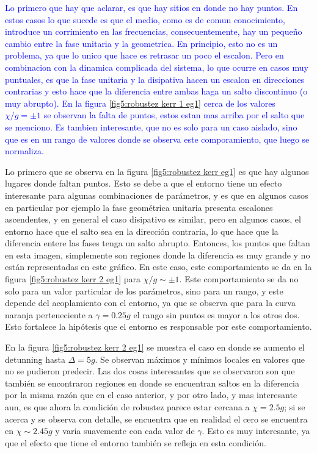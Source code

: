 \textcolor{blue}{Lo primero que hay que aclarar, es que hay sitios en donde no hay puntos. En estos casos lo que sucede es que el medio, como es de comun conocimiento, introduce un corrimiento en las frecuencias, consecuentemente, hay un pequeño cambio entre la fase unitaria y la geometrica. En principio, esto no es un problema, ya que lo unico que hace es retrasar un poco el escalon. Pero en combinacion con la dinamica complicada del sistema, lo que ocurre en casos muy puntuales, es que la fase unitaria y la disipativa hacen un escalon en direcciones contrarias y esto hace que la diferencia entre ambas haga un salto discontinuo (o muy abrupto). En la figura \ref{fig5:robustez kerr 1 eg1} cerca de los valores $\chi/g=\pm 1$ se observan la falta de puntos, estos estan mas arriba por el salto que se menciono. Es tambien interesante, que no es solo para un caso aislado, sino que es en un rango de valores donde se observa este comporamiento, que luego se normaliza. }

Lo primero que se observa en la figura \ref{fig5:robustez kerr eg1} es que hay algunos lugares donde faltan puntos. Esto se debe a que el entorno tiene un efecto interesante para algunas combinaciones de parámetros, y es que en algunos casos en particular por ejemplo la fase geométrica unitaria presenta escalones ascendentes, y en general el caso disipativo es similar, pero en algunos casos, el entorno hace que el salto sea en la dirección contraria, lo que hace que la diferencia entere las fases tenga un salto abrupto. Entonces, los puntos que faltan en esta imagen, simplemente son regiones donde la diferencia es muy grande y no están representadas en este gráfico. En este caso, este comportamiento se da en la figura \ref{fig5:robustez kerr 2 eg1} para $\chi / g \sim \pm 1$. Este comportamiento se da no solo para un valor particular de los parámetros, sino para un rango, y este depende del acoplamiento con el entorno, ya que se observa que para la curva naranja perteneciente a $\gamma=0.25g$ el rango sin puntos es mayor a los otros dos. Esto fortalece la hipótesis que el entorno es responsable por este comportamiento.

En la figura \ref{fig5:robustez kerr 2 eg1} se muestra el caso en donde se aumento el detunning hasta $\Delta=5g$. Se observan máximos y mínimos locales en valores que no se pudieron predecir. Las dos cosas interesantes que se observaron son que también se encontraron regiones en donde se encuentran saltos en la diferencia por la misma razón que en el caso anterior, y por otro lado, y mas interesante aun, es que ahora la condición de robustez parece estar cercana a $\chi=2.5g$; si se acerca y se observa con detalle, se encuentra que en realidad el cero se encuentra en $\chi\sim 2.45g$ y varia suavemente con cada valor de $\gamma$. Esto es muy interesante, ya que el efecto que tiene el entorno también se refleja en esta condición.

